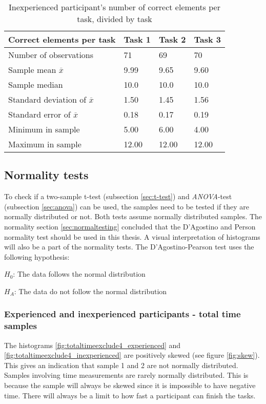 \begin{table}[H]
	\centering
	\begin{tabular}{l|l|l|l}
		Correct elements per task & Task 1 & Task 2 & Task 3 \\ \hline
		Number of observations & 71    & 69  & 70  \\
		Sample mean $\overline{x}$  & 9.99  &  9.65  &  9.60  \\
		Sample median  & 10.0  & 10.0  &  10.0  \\
		Standard deviation of $\overline{x}$  & 1.50  & 1.45  & 1.56   \\
		Standard error of $\overline{x}$  & 0.18 & 0.17 & 0.19  \\
		Minimum in sample  & 5.00 & 6.00 &  4.00  \\
		Maximum in sample  & 12.00 & 12.00  & 12.00 \\ \hline
	\end{tabular}
	\caption[Correct elements, inexperienced per task]{Inexperienced participant's number of correct elements per task, divided by task}
	\label{tab:totalcorrect_tasks_inexperienced}
\end{table}

\subsection{Normality tests}\label{sec:normality_results}
To check if a two-sample t-test (subsection \ref{sec:t-test}) and \textit{ANOVA}-test (subsection \ref{sec:anova}) can be used, the samples need to be tested if they are normally distributed or not. Both tests assume normally distributed samples. The normality section \ref{sec:normaltesting} concluded that the D'Agostino and Person normality test should be used in this thesis. A visual interpretation of histograms will also be a part of the normality tests. The D'Agostino-Pearson test uses the following hypothesis:\newline

\centerline{$H_{0}$: The data follows the normal distribution} 
\centerline{$H_{A}$: The data do not follow the normal distribution}


\subsubsection[Sample 1 and 2]{Experienced and inexperienced participants - total time samples}\label{sec:totaltime_ex_inex}
The histograms \ref{fig:totaltimeexclude4_experienced} and \ref{fig:totaltimeexclude4_inexperienced} are positively skewed (see figure \ref{fig:skew}). This gives an indication that sample 1 and 2 are not normally distributed. Samples involving time measurements are rarely normally distributed. This is because the sample will always be skewed since it is impossible to have negative time. There will always be a limit to how fast a participant can finish the tasks. 

